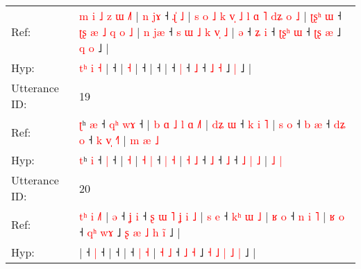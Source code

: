 \documentclass[10pt]{article}
\DeclareRobustCommand{\hl}[1]{{\textcolor{red}{#1}}}
\begin{document}
\begin{longtable}{ll}
Ref: & \hl{m}\hl{ }\hl{i}\hl{ }\hl{˩}\hl{ }\hl{z} \hl{ɯ} \hl{˩}\hl{˥} |\hl{ }\hl{n}\hl{ }\hl{j}\hl{ɤ} ˧\hl{ }\hl{ɻ}\hl{̍}\hl{ }\hl{˩} |\hl{ }\hl{s}\hl{ }\hl{o}\hl{ }\hl{˩}\hl{ }\hl{k}\hl{ }\hl{v}\hl{̩}\hl{ }\hl{˩}\hl{ }\hl{l}\hl{ }\hl{ɑ}\hl{ }\hl{˥}\hl{ }\hl{d}\hl{ʑ}\hl{ }\hl{o} \hl{˩} |\hl{ }\hl{ʈ}\hl{ʂ}\hl{ʰ}\hl{ }\hl{ɯ} ˧\hl{ }\hl{ʈ}\hl{ʂ}\hl{ }\hl{æ}\hl{ }\hl{˩}\hl{ }\hl{q}\hl{ }\hl{o}\hl{ }\hl{˩} |\hl{ }\hl{n}\hl{ }\hl{j}\hl{æ} ˧\hl{ }\hl{s}\hl{ }\hl{ɯ}\hl{ }\hl{˩}\hl{ }\hl{k}\hl{ }\hl{v}\hl{̩}\hl{ }\hl{˩} |\hl{ }\hl{ə} ˧\hl{ }\hl{ʑ} \hl{i} ˧\hl{ }\hl{ʈ}\hl{ʂ}\hl{ʰ} \hl{ɯ} ˧ \hl{ʈ}\hl{ʂ} \hl{æ} ˩\hl{ }\hl{q} \hl{o} ˩ |
 \\
Hyp: & \hl{}\hl{}\hl{}\hl{}\hl{}\hl{t}\hl{ʰ} \hl{i} \hl{}\hl{˧} |\hl{}\hl{}\hl{}\hl{}\hl{} ˧\hl{}\hl{}\hl{}\hl{}\hl{} |\hl{}\hl{}\hl{}\hl{}\hl{}\hl{}\hl{}\hl{}\hl{}\hl{}\hl{}\hl{}\hl{}\hl{}\hl{}\hl{}\hl{}\hl{}\hl{}\hl{}\hl{}\hl{}\hl{}\hl{} \hl{˧} |\hl{}\hl{}\hl{}\hl{}\hl{}\hl{} ˧\hl{}\hl{}\hl{}\hl{}\hl{}\hl{}\hl{}\hl{}\hl{}\hl{}\hl{}\hl{}\hl{} |\hl{}\hl{}\hl{}\hl{}\hl{} ˧\hl{}\hl{}\hl{}\hl{}\hl{}\hl{}\hl{}\hl{}\hl{}\hl{}\hl{}\hl{}\hl{} |\hl{}\hl{} ˧\hl{}\hl{} \hl{|} ˧\hl{}\hl{}\hl{}\hl{} \hl{˩} ˧ \hl{}\hl{˩} \hl{˧} ˩\hl{}\hl{} \hl{|} ˩ |
 \\
\midrule
Utterance ID: & 19 \\
Ref: & \hl{ʈ}ʰ \hl{æ} ˧\hl{ }\hl{q}\hl{ʰ} \hl{w}\hl{ɤ} ˧ |\hl{ }\hl{b}\hl{ }\hl{ɑ}\hl{ }\hl{˩}\hl{ }\hl{l}\hl{ }\hl{ɑ} \hl{˩}\hl{˥} | \hl{d}\hl{ʑ} \hl{ɯ} ˧\hl{ }\hl{k} \hl{i} \hl{˥} | \hl{s} \hl{o} ˧\hl{ }\hl{b} \hl{æ} ˧\hl{ }\hl{d}\hl{ʑ} \hl{o} ˧ \hl{k} \hl{v}\hl{̩} \hl{˧}\hl{˥} |\hl{ }\hl{m} \hl{æ} \hl{˩}
 \\
Hyp: & \hl{t}ʰ \hl{i} ˧\hl{}\hl{}\hl{} \hl{}\hl{|} ˧ |\hl{}\hl{}\hl{}\hl{}\hl{}\hl{}\hl{}\hl{}\hl{}\hl{} \hl{}\hl{˧} | \hl{}\hl{˧} \hl{|} ˧\hl{}\hl{} \hl{|} \hl{˧} | \hl{˧} \hl{˩} ˧\hl{}\hl{} \hl{˩} ˧\hl{}\hl{}\hl{} \hl{˩} ˧ \hl{˩} \hl{}\hl{|} \hl{}\hl{˩} |\hl{}\hl{} \hl{˩} \hl{|}
 \\
\midrule
Utterance ID: & 20 \\
Ref: & \hl{t}\hl{ʰ}\hl{ }\hl{i}\hl{ }\hl{˩}\hl{˥}\hl{ }|\hl{ }\hl{ə} ˧\hl{ }\hl{ʝ} \hl{i} ˧\hl{ }\hl{ʂ}\hl{ }\hl{ɯ}\hl{ }\hl{˥}\hl{ }\hl{ʝ}\hl{ }\hl{i}\hl{ }\hl{˩} |\hl{ }\hl{s}\hl{ }\hl{e} ˧\hl{ }\hl{k}\hl{ʰ}\hl{ }\hl{ɯ}\hl{ }\hl{˩} |\hl{ }\hl{ʁ}\hl{ }\hl{o} ˧\hl{ }\hl{n} \hl{i} \hl{˥} | \hl{ʁ} \hl{o} ˧ \hl{q}\hl{ʰ} \hl{w}\hl{ɤ} ˩ \hl{ʂ} \hl{æ} \hl{˩} \hl{h} \hl{i}\hl{̃} ˩ |
 \\
Hyp: & \hl{}\hl{}\hl{}\hl{}\hl{}\hl{}\hl{}\hl{}|\hl{}\hl{} ˧\hl{}\hl{} \hl{|} ˧\hl{}\hl{}\hl{}\hl{}\hl{}\hl{}\hl{}\hl{}\hl{}\hl{}\hl{}\hl{} |\hl{}\hl{}\hl{}\hl{} ˧\hl{}\hl{}\hl{}\hl{}\hl{}\hl{}\hl{} |\hl{}\hl{}\hl{}\hl{} ˧\hl{}\hl{} \hl{|} \hl{˧} | \hl{˧} \hl{˩} ˧ \hl{}\hl{˩} \hl{}\hl{˧} ˩ \hl{˧} \hl{˩} \hl{|} \hl{˩} \hl{}\hl{|} ˩ |

\end{longtable}
\end{document}
